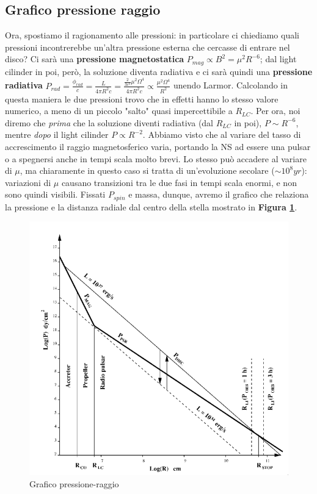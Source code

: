 \subsection{Grafico pressione raggio}
Ora, spostiamo il ragionamento alle pressioni: in particolare ci chiediamo quali pressioni incontrerebbe un'altra pressione esterna che cercasse di entrare nel disco?
Ci sarà una \textbf{pressione magnetostatica} $P_{mag}\propto B^2 = \mu^2R^{-6}$; dal light cilinder in poi, però, la soluzione diventa radiativa e ci sarà quindi una \textbf{pressione radiativa} $P_{rad} = \frac{\phi_{rad}}{c} = \frac{L}{4\pi R^2c} = \frac{\frac{2}{3c^3}\mu^2\Omega^4}{4\pi R^2c} \propto \frac{\mu^2\Omega^4}{R^2} $ unendo Larmor.
Calcolando in questa maniera le due pressioni trovo che in effetti hanno lo stesso valore numerico, a meno di un piccolo "salto" quasi impercettibile a $R_{LC}$.
Per ora, noi diremo che \textit{prima} che la soluzione diventi radiativa (dal $R_{LC}$ in poi), $P\sim R^{-6}$, mentre \textit{dopo} il light cilinder $P\propto R^{-2}$.
Abbiamo visto che al variare del tasso di accrescimento il raggio magnetosferico varia, portando la NS ad essere una pulsar o a spegnersi anche in tempi scala molto brevi.
Lo stesso può accadere al variare di $\mu$, ma chiaramente in questo caso si tratta di un'evoluzione secolare ($\sim 10^{8}yr $): variazioni di $\mu$ causano transizioni tra le due fasi in tempi scala enormi, e non sono quindi visibili.
Fissati $P_{spin}$ e massa, dunque, avremo il grafico che relaziona la pressione e la distanza radiale dal centro della stella mostrato in \textbf{Figura \ref{fig: grafico pressione raggio}}.
\begin{figure}[ht!]
    \centering
    \includegraphics[width=0.6\linewidth]{Immagini/Grafico_pressione_raggio.png}
    \caption{Grafico pressione-raggio}
    \label{fig: grafico pressione raggio}
\end{figure}
